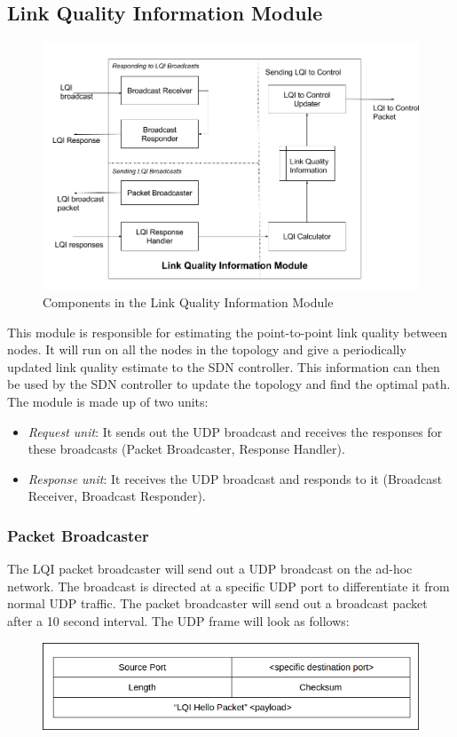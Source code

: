 \documentclass{article}
\begin{document}
\subsection{Link Quality Information Module}
\begin{figure}[H]
\caption{Components in the Link Quality Information Module}
\centering
\includegraphics[width=\textwidth]{lqi}
\end{figure}
This module is responsible for estimating the point-to-point link quality between nodes. It will run on all the nodes in
the topology and give a periodically updated link quality estimate to the SDN controller. This information can then be
used by the SDN controller to update the topology and find the optimal path. The module is made up of two units: 
\begin{itemize}
\item \textit{Request unit}: It sends out the UDP broadcast and receives the responses for these broadcasts (Packet Broadcaster, Response Handler).
\item \textit{Response unit}: It receives the UDP broadcast and responds to it (Broadcast Receiver, Broadcast Responder).
\end{itemize}
\subsubsection{Packet Broadcaster} 
The LQI packet broadcaster will send out a UDP broadcast on the ad-hoc network. The broadcast is directed at a specific
UDP port to differentiate it from normal UDP traffic. The packet broadcaster will send out a broadcast packet after a 10
second interval. The UDP frame will look as follows:
\begin{figure}[H]
\centering
\includegraphics[width=\textwidth]{packet_broadcaster}
\end{figure}
\end{document}
